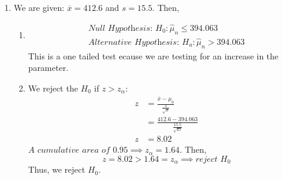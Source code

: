 \documentclass[13pt]{article}
\begin{document}
\begin{enumerate}[label=(\alph*)]
\item 
  We are given: $\overline{x} = 412.6$ and $s = 15.5$. Then,
  \begin{enumerate}[label=(\roman*)]
  \item
    \begin{align*}
      \textit{Null Hypothesis: } H_0: \hat{\mu}_n \leq 394.063 \\
      \textit{Alternative Hypothesis: } H_a: \hat{\mu}_n > 394.063
    \end{align*}
    This is a one tailed test ecause we are testing for an increase in the parameter.
  \item We reject the $H_0$ if $z > z_\alpha$:
    \begin{align*}
      z &= \frac{\overline{x} - \mu_0}{\frac{s}{\sqrt{n}}} \\
        &= \frac{412.6 - 394.063}{\frac{15.5}{\sqrt{45}}} \\
      z &= 8.02
    \end{align*}
    $\textit{A cumulative area of } 0.95 \implies z_\alpha = 1.64$. Then,
    \[z = 8.02 > 1.64 = z_\alpha \implies \textit{reject } H_0\]
    Thus, we reject $H_0$.
  \end{enumerate}
\end{enumerate}
\end{document}
